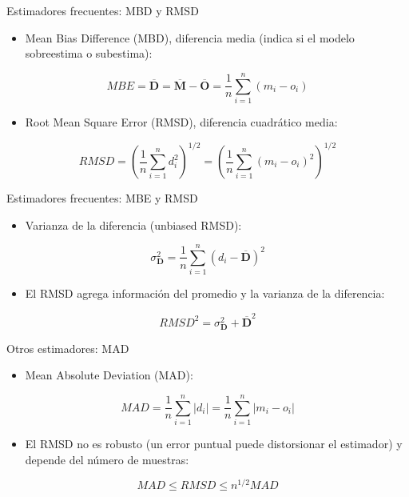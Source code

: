 \documentclass[xcolor={usenames,svgnames,dvipsnames}]{beamer}
\begin{document}
\begin{frame}[label={sec:org1200e6e}]{Estimadores frecuentes: MBD y RMSD}
\begin{itemize}
\item Mean Bias Difference (MBD), diferencia media (indica si el modelo sobreestima o subestima):
\end{itemize}
\[
MBE = \overline{\mathbf{D}} = \overline{\mathbf{M}} - \overline{\mathbf{O}} = \frac{1}{n} \sum_{i=1}^n (m_i - o_i)
\]
\pause
\begin{itemize}
\item Root Mean Square Error (RMSD), diferencia cuadrático media:
\end{itemize}
\[
RMSD = \left(\frac{1}{n} \sum_{i=1}^n d_i^2 \right)^{1/2} =  \left( \frac{1}{n} \sum_{i=1}^n (m_i - o_i)^2  \right)^{1/2}
\]
\end{frame}

\begin{frame}[label={sec:org8d07abe}]{Estimadores frecuentes: MBE y RMSD}
\begin{itemize}
\item Varianza de la diferencia (unbiased RMSD):
\end{itemize}
\[
\sigma^2_{\mathbf{D}} = \frac{1}{n} \sum_{i=1}^n (d_i - \overline{\mathbf{D}})^2
\]
\pause

\begin{itemize}
\item El RMSD agrega información del promedio y la varianza de la
diferencia:
\end{itemize}
\[
RMSD^2= \sigma^2_{\mathbf{D}} + \overline{\mathbf{D}}^2
\]
\end{frame}

\begin{frame}[label={sec:orge0de85f}]{Otros estimadores: MAD}
\begin{itemize}
\item Mean Absolute Deviation (MAD):
\end{itemize}

\[
MAD = \frac{1}{n} \sum_{i=1}^n \left|d_i\right| =  \frac{1}{n} \sum_{i=1}^n \left|m_i - o_i\right|
\]
\begin{itemize}
\item El RMSD no es robusto (un error puntual puede distorsionar el estimador) y depende del número de muestras:
\end{itemize}
\[
MAD \leq RMSD \leq n^{1/2} MAD
\]

\nocite{Willmott.Matsuura.ea2009, Willmott.Matsuura2005a}
\end{frame}
\end{document}
